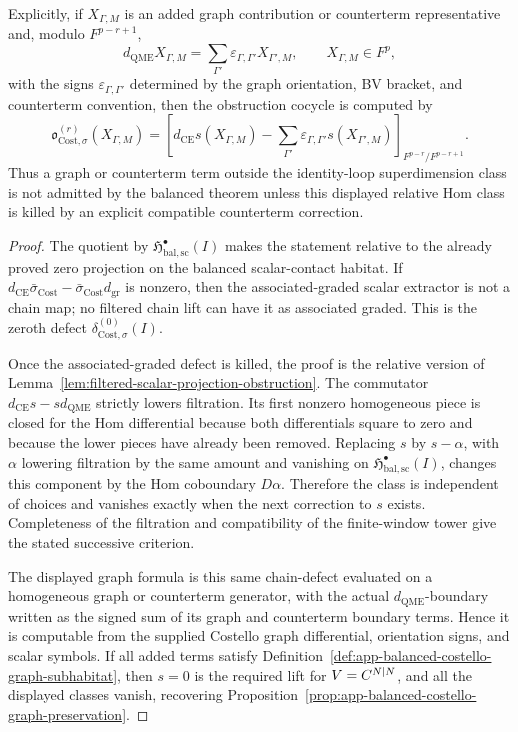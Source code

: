 \begin{thm}
  Explicitly, if \(X_{\Gamma,M}\) is an added graph contribution or
  counterterm representative and, modulo \(F^{p-r+1}\),
  \[
    d_{\mathrm{QME}}X_{\Gamma,M}
      =
    \sum_{\Gamma'}\varepsilon_{\Gamma,\Gamma'}X_{\Gamma',M},
    \qquad
    X_{\Gamma,M}\in F^p,
  \]
  with the signs \(\varepsilon_{\Gamma,\Gamma'}\) determined by the
  graph orientation, BV bracket, and counterterm convention, then the
  obstruction cocycle is computed by
  \[
    \mathfrak o^{(r)}_{\mathrm{Cost},\sigma}(X_{\Gamma,M})
      =
    {\left[
      d_{\mathrm{CE}}s(X_{\Gamma,M})
        -
      \sum_{\Gamma'}\varepsilon_{\Gamma,\Gamma'}s(X_{\Gamma',M})
    \right]}_{F^{p-r}/F^{p-r+1}} .
  \]
  Thus a graph or counterterm term outside the identity-loop
  superdimension class is not admitted by the balanced theorem unless
  this displayed relative Hom class is killed by an explicit compatible
  counterterm correction.
\end{thm}

\begin{proof}
  The quotient by
  \(\mathfrak H^\bullet_{\mathrm{bal,sc}}(I)\) makes the statement
  relative to the already proved zero projection on the balanced
  scalar-contact habitat.  If
  \(d_{\mathrm{CE}}\bar\sigma_{\mathrm{Cost}}
    -\bar\sigma_{\mathrm{Cost}}d_{\operatorname{gr}}\)
  is nonzero, then the associated-graded scalar extractor is not a chain
  map; no filtered chain lift can have it as associated graded.  This is
  the zeroth defect
  \(\delta^{(0)}_{\mathrm{Cost},\sigma}(I)\).

  Once the associated-graded defect is killed, the proof is the relative
  version of Lemma~\ref{lem:filtered-scalar-projection-obstruction}.
  The commutator \(d_{\mathrm{CE}}s-sd_{\mathrm{QME}}\) strictly lowers
  filtration.  Its first nonzero homogeneous piece is closed for the Hom
  differential because both differentials square to zero and because the
  lower pieces have already been removed.  Replacing \(s\) by
  \(s-\alpha\), with \(\alpha\) lowering filtration by the same amount
  and vanishing on
  \(\mathfrak H^\bullet_{\mathrm{bal,sc}}(I)\), changes this component
  by the Hom coboundary \(D\alpha\).  Therefore the class is independent
  of choices and vanishes exactly when the next correction to \(s\)
  exists.  Completeness of the filtration and compatibility of the
  finite-window tower give the stated successive criterion.

  The displayed graph formula is this same chain-defect evaluated on a
  homogeneous graph or counterterm generator, with the actual
  \(d_{\mathrm{QME}}\)-boundary written as the signed sum of its graph
  and counterterm boundary terms.  Hence it is computable from the
  supplied Costello graph differential, orientation signs, and scalar
  symbols.  If all added terms satisfy
  Definition~\ref{def:app-balanced-costello-graph-subhabitat}, then
  \(s=0\) is the required lift for \(V=C^{N|N}\), and all the displayed
  classes vanish, recovering
  Proposition~\ref{prop:app-balanced-costello-graph-preservation}.
\end{proof}


